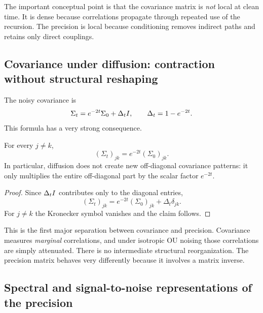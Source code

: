 \documentclass[11pt]{article}
\begin{document}
The important conceptual point is that the covariance matrix is \emph{not} local at clean time. It is dense because correlations propagate through repeated use of the recursion. The precision is local because conditioning removes indirect paths and retains only direct couplings.

\subsection{Covariance under diffusion: contraction without structural reshaping}

The noisy covariance is
\begin{equation}
 \Sigma_t=e^{-2t}\Sigma_0+\Delta_tI,
 \qquad \Delta_t=1-e^{-2t}.
\end{equation}
This formula has a very strong consequence.

\begin{proposition}\label{prop:cov_profile}
For every $j\neq k$,
\begin{equation}
 (\Sigma_t)_{jk}=e^{-2t}(\Sigma_0)_{jk}.
\end{equation}
In particular, diffusion does not create new off-diagonal covariance patterns: it only multiplies the entire off-diagonal part by the scalar factor $e^{-2t}$.
\end{proposition}

\begin{proof}
Since $\Delta_tI$ contributes only to the diagonal entries,
\begin{equation}
 (\Sigma_t)_{jk}=e^{-2t}(\Sigma_0)_{jk}+\Delta_t\delta_{jk}.
\end{equation}
For $j\neq k$ the Kronecker symbol vanishes and the claim follows.
\end{proof}

This is the first major separation between covariance and precision. Covariance measures \emph{marginal} correlations, and under isotropic OU noising those correlations are simply attenuated. There is no intermediate structural reorganization. The precision matrix behaves very differently because it involves a matrix inverse.

\subsection{Spectral and signal-to-noise representations of the precision}
\end{document}
